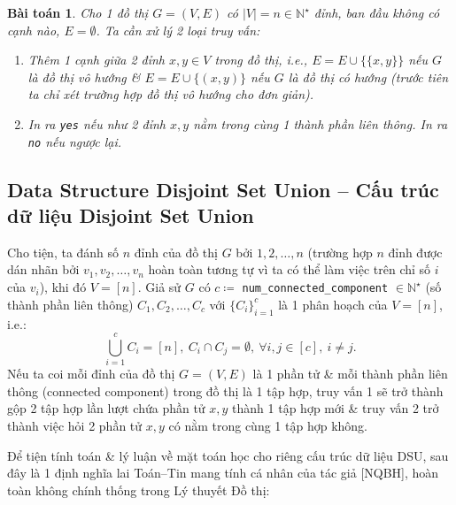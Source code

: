 \documentclass{article}
\newtheorem{baitoan}{Bài toán}
\begin{document}
\begin{baitoan}
    \label{prob: query connectedness}
    Cho 1 đồ thị $G = (V,E)$ có $|V| = n\in\mathbb{N}^\star$ đỉnh, ban đầu không có cạnh nào, $E = \emptyset$. Ta cần xử lý 2 loại truy vấn:
    \begin{enumerate}
        \item Thêm 1 cạnh giữa 2 đỉnh $x,y\in V$ trong đồ thị, i.e., $E = E\cup\{\{x,y\}\}$ nếu $G$ là đồ thị vô hướng \& $E = E\cup\{(x,y)\}$ nếu $G$ là đồ thị có hướng (trước tiên ta chỉ xét trường hợp đồ thị vô hướng cho đơn giản).
        \item In ra {\tt yes} nếu như 2 đỉnh $x,y$ nằm trong cùng 1 thành phần liên thông. In ra {\tt no} nếu ngược lại.
    \end{enumerate}
\end{baitoan}


\subsection{Data Structure Disjoint Set Union -- Cấu trúc dữ liệu Disjoint Set Union}
Cho tiện, ta đánh số $n$ đỉnh của đồ thị $G$ bởi $1,2,\ldots,n$ (trường hợp $n$ đỉnh được dán nhãn bởi $v_1,v_2,\ldots,v_n$ hoàn toàn tương tự vì ta có thể làm việc trên chỉ số $i$ của $v_i$), khi đó $V = [n]$. Giả sử $G$ có $c\coloneqq$ \verb|num_connected_component| $\in\mathbb{N}^\star$ (số thành phần liên thông) $C_1,C_2,\ldots,C_c$ với $\{C_i\}_{i=1}^c$ là 1 phân hoạch của $V = [n]$, i.e.:
\begin{equation*}
    \bigcup_{i=1}^c C_i = [n],\ C_i\cap C_j = \emptyset,\ \forall i,j\in[c],\ i\ne j.
\end{equation*}
Nếu ta coi mỗi đỉnh của đồ thị $G = (V,E)$ là 1 phần tử \& mỗi thành phần liên thông (connected component) trong đồ thị là 1 tập hợp, truy vấn 1 sẽ trở thành gộp 2 tập hợp lần lượt chứa phần tử $x,y$ thành 1 tập hợp mới \& truy vấn 2 trở thành việc hỏi 2 phần tử $x,y$ có nằm trong cùng 1 tập hợp không.

Để tiện tính toán \& lý luận về mặt toán học cho riêng cấu trúc dữ liệu DSU, sau đây là 1 định nghĩa lai Toán--Tin mang tính cá nhân của tác giả [NQBH], hoàn toàn không chính thống trong Lý thuyết Đồ thị:
\end{document}

